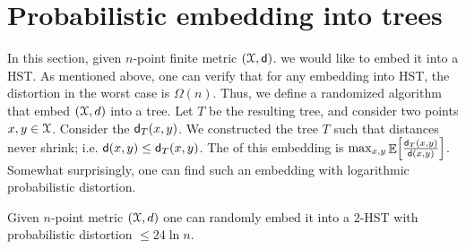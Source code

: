 
\section{Probabilistic embedding into trees}

In this section, given $n$-point finite metric $(\FMS,\DistChar)$. we
would like to embed it into a HST. As mentioned above, one can verify
that for any embedding into HST, the distortion in the worst case is
$\Omega(n)$.  Thus, we define a randomized algorithm that embed
$(\FMS,d)$ into a tree. Let $T$ be the resulting tree, and consider
two points $x,y \in \FMS$. Consider the 
$\mathsf{d}_T(x,y)$. We constructed the tree $T$ such that distances never
shrink; i.e.  $\mathsf{d}(x,y) \leq \mathsf{d}_T(x,y)$. The  of this embedding is $\max_{x,y}
\mathop{\mathbb{E}}\!\left[ {\frac{\mathsf{d}_T(x,y)}{\mathsf{d}(x,y)}} \right]$.  Somewhat surprisingly, one can
find such an embedding with logarithmic probabilistic distortion.




\begin{theorem}
    Given $n$-point metric $(\FMS,d)$ one can randomly embed it into a
    $2$-HST  with probabilistic distortion $\leq 24 \ln n$.

\end{theorem}

